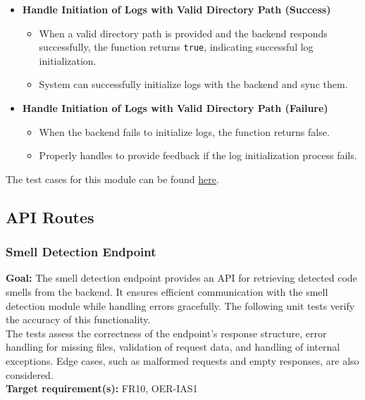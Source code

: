 \documentclass[12pt, titlepage]{article}
\begin{document}
\begin{enumerate}[label={\bf \textcolor{Maroon}{test-SRT-\arabic*}}, wide=0pt, font=\itshape]
\begin{itemize}
    \item \textbf{Handle Initiation of Logs with Valid Directory Path (Success)}
    \begin{itemize}
        \item When a valid directory path is provided and the backend responds successfully, the function returns \texttt{true}, indicating successful log initialization.
        \item System can successfully initialize logs with the backend and sync them.
    \end{itemize}

    \item \textbf{Handle Initiation of Logs with Valid Directory Path (Failure)}
    \begin{itemize}
        \item When the backend fails to initialize logs, the function returns false.
        \item Properly handles to provide feedback if the log initialization process fails.
    \end{itemize}
\end{itemize}

\noindent The test cases for this module can be found \href{https://github.com/ssm-lab/capstone--sco-vs-code-plugin/blob/plugin-multi-file/test/api/backend.test.ts}{here}.

\subsection{API Routes}

\subsubsection{Smell Detection Endpoint}

\textbf{Goal:} The smell detection endpoint provides an API for retrieving detected code smells from the backend. It ensures efficient communication with the smell detection module while handling errors gracefully. The following unit tests verify the accuracy of this functionality.\\

\noindent The tests assess the correctness of the endpoint’s response structure, error handling for missing files, validation of request data, and handling of internal exceptions. Edge cases, such as malformed requests and empty responses, are also considered.\\

\noindent\textbf{Target requirement(s):} FR10, OER-IAS1~\cite{SRS} \\


\end{enumerate}
\end{document}
